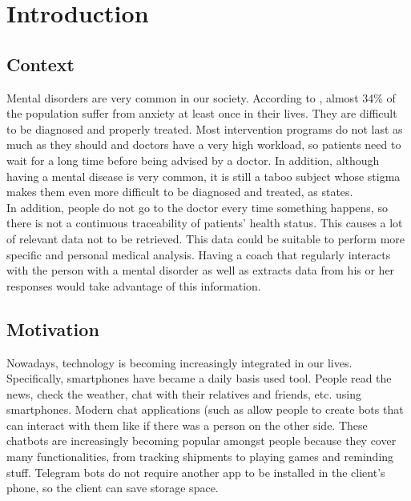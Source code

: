\documentclass[12pt,english]{article}
\begin{document}


\thispagestyle{empty}
\newpage
\tableofcontents{}
\newpage
\section{Introduction}
\subsection{Context}

Mental disorders are very common in our society. According to \cite{Bandelow2015}, almost 34\% of the population suffer from anxiety at least once in their lives. They are difficult to be diagnosed and properly treated. Most intervention programs do not last as much as they should and doctors have a very high workload, so patients need to wait for a long time before being advised by a doctor. In addition, although having a mental disease is very common, it is still a taboo subject whose stigma makes them even more difficult to be diagnosed and treated, as \cite{Davies2000} states.\\

In addition, people do not go to the doctor every time something happens, so there is not a continuous traceability of patients' health status. This causes a lot of relevant data not to be retrieved. This data could be suitable to perform more specific and personal medical analysis. Having a coach that regularly interacts with the person with a mental disorder as well as extracts data from his or her responses would take advantage of this information.


\subsection{Motivation}

Nowadays, technology is becoming increasingly integrated in our lives. Specifically, smartphones have became a daily basis used tool. People read the news, check the weather, chat with their relatives and friends, etc. using smartphones. Modern chat applications (such as \cite{Telegram} allow people to create bots that can interact with them like if there was a person on the other side. These chatbots are increasingly becoming popular amongst people because they cover many functionalities, from tracking shipments to playing games and reminding stuff. Telegram bots do not require another app to be installed in the client's phone, so the client can save storage space.\\
\end{document}

